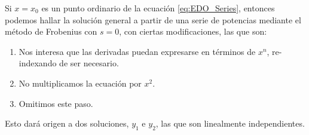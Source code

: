 \begin{teorema}
    Si $x=x_0$ es un punto ordinario de la ecuación \eqref{eq:EDO_Series}, entonces podemos hallar la solución general a partir de una serie de potencias mediante el método de Frobenius con $s=0$, con ciertas modificaciones, las que son:
    \begin{enumerate}
        \item Nos interesa que las derivadas puedan expresarse en términos de $x^n$, re-indexando de ser necesario.
        \item No multiplicamos la ecuación por $x^2$.
        \item Omitimos este paso.
    \end{enumerate}
    
    Esto dará origen a dos soluciones, $y_1$ e $y_2$, las que son linealmente independientes.
\end{teorema}

